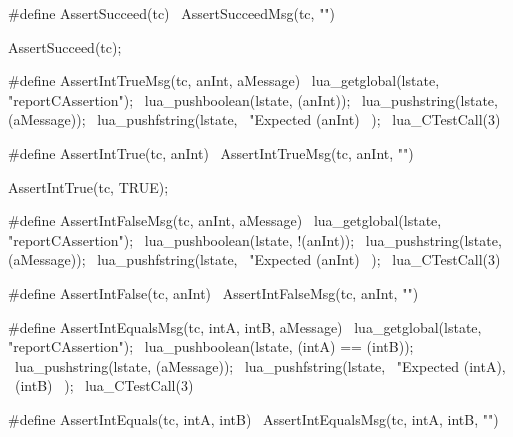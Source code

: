 #define AssertSucceed(tc) \
  AssertSucceedMsg(tc, "")
\stopCHeader


\startCTest
  AssertSucceed(tc);
\stopCTest
\stopTestCase

\stopTestSuite

\startTestSuite[assertIntTrue]

\startCHeader
#define AssertIntTrueMsg(tc, anInt, aMessage) \
  lua_getglobal(lstate, "reportCAssertion");  \
  lua_pushboolean(lstate, (anInt));           \
  lua_pushstring(lstate, (aMessage));         \
  lua_pushfstring(lstate,                     \
      "Expected %
      (anInt)                                 \
    );                                        \
  lua_CTestCall(3)

#define AssertIntTrue(tc, anInt) \
  AssertIntTrueMsg(tc, anInt, "")
\stopCHeader

\startTestCase[should succeed if true]
\startCTest
  AssertIntTrue(tc, TRUE);
\stopCTest
\stopTestCase
\stopTestSuite

\startTestSuite[assertIntFalse]

\startCHeader
#define AssertIntFalseMsg(tc, anInt, aMessage) \
  lua_getglobal(lstate, "reportCAssertion");   \
  lua_pushboolean(lstate, !(anInt));           \
  lua_pushstring(lstate, (aMessage));          \
  lua_pushfstring(lstate,                      \
      "Expected %
      (anInt)                                  \
    );                                         \
  lua_CTestCall(3)

#define AssertIntFalse(tc, anInt) \
  AssertIntFalseMsg(tc, anInt, "")
\stopCHeader

\stopTestSuite

\startTestSuite[assertIntEquals]

\startCHeader
#define AssertIntEqualsMsg(tc, intA, intB, aMessage) \
  lua_getglobal(lstate, "reportCAssertion");         \
  lua_pushboolean(lstate, (intA) == (intB));         \
  lua_pushstring(lstate, (aMessage));                \
  lua_pushfstring(lstate,                            \
      "Expected %
      (intA),                                        \
      (intB)                                         \
    );                                               \
  lua_CTestCall(3)

#define AssertIntEquals(tc, intA, intB) \
  AssertIntEqualsMsg(tc, intA, intB, "")
\stopCHeader

